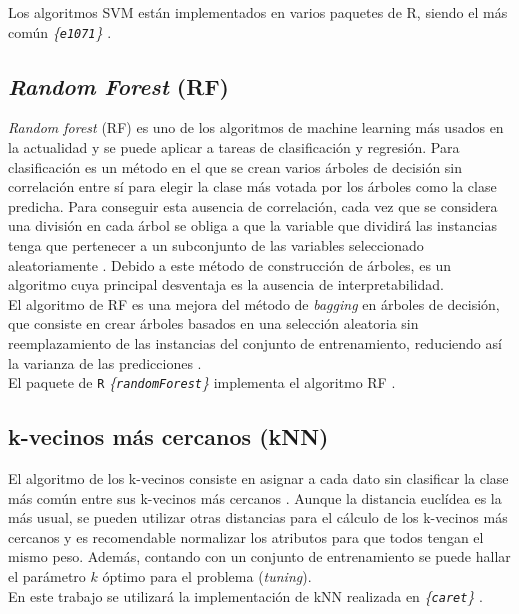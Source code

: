 Los algoritmos SVM están implementados en varios paquetes de R, siendo el más común \textit{\{\texttt{e1071}\}} \cite{Meyer2019}.

\subsection{\textit{Random Forest} (RF)}

\textit{Random forest} (RF) es uno de los algoritmos de machine learning más usados en la actualidad y se puede aplicar a tareas de clasificación y regresión. Para clasificación es un método en el que se crean varios árboles de decisión sin correlación entre sí para elegir la clase más votada por los árboles como la clase predicha. Para conseguir esta ausencia de correlación, cada vez que se considera una división en cada árbol se obliga a que la variable que dividirá las instancias tenga que pertenecer a un subconjunto de las variables seleccionado aleatoriamente \cite{Breiman2001, Breiman2002}. Debido a este método de construcción de árboles, es un algoritmo cuya principal desventaja es la ausencia de interpretabilidad.\\

El algoritmo de RF es una mejora del método de \textit{bagging} en árboles de decisión, que consiste en crear árboles basados en una selección aleatoria sin reemplazamiento de las instancias del conjunto de entrenamiento, reduciendo así la varianza de las predicciones \cite{Breiman1996}.\\

El paquete de \texttt{R} \textit{\{\texttt{randomForest}\}} implementa el algoritmo RF \cite{Liaw2002}.

\subsection{k-vecinos más cercanos (kNN)}

El algoritmo de los k-vecinos consiste en asignar a cada dato sin clasificar la clase más común entre sus k-vecinos más cercanos \cite{Altman1992}. Aunque la distancia euclídea es la más usual, se pueden utilizar otras distancias para el cálculo de los k-vecinos más cercanos \cite{Hu2016} y es recomendable normalizar los atributos para que todos tengan el mismo peso. Además, contando con un conjunto de entrenamiento se puede hallar el parámetro $k$ óptimo para el problema (\textit{tuning}).\\

En este trabajo se utilizará la implementación de kNN realizada en \textit{\{\texttt{caret}\}} \cite{Kuhn2020}.

